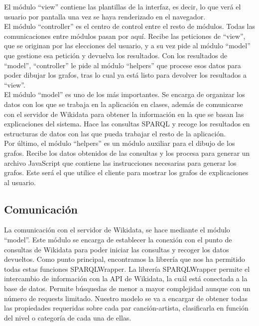 El módulo ``view'' contiene las plantillas de la interfaz, es decir, lo que verá el usuario por pantalla una vez se haya renderizado en el navegador.\\

El módulo ``controller'' es el centro de control entre el resto de módulos. Todas las comunicaciones entre módulos pasan por aquí. Recibe las peticiones de ``view'', que se originan por las elecciones del usuario, y a su vez pide al módulo ``model'' que gestione esa petición y devuelva los resultados. Con los resultados de ``model'', ``controller'' le pide al módulo ``helpers'' que procese esos datos para poder dibujar los grafos, tras lo cual ya está listo para devolver los resultados a ``view''.\\

El módulo ``model'' es uno de los más importantes. Se encarga de organizar los datos con los que se trabaja en la aplicación en clases, además de comunicarse con el servidor de Wikidata para obtener la información en la que se basan las explicaciones del sistema. Hace las consultas SPARQL y recoge los resultados en estructuras de datos con las que pueda trabajar el resto de la aplicación.\\

Por último, el módulo ``helpers'' es un módulo auxiliar para el dibujo de los grafos. Recibe los datos obtenidos de las consultas y los procesa para generar un archivo JavaScript que contiene las instrucciones necesarias para generar los grafos. Este será el que utilice el cliente para mostrar los grafos de explicaciones al usuario.\\

\subsection{Comunicación}

La comunicación con el servidor de Wikidata, se hace mediante el módulo ``model''. Este módulo se encarga de establecer la conexión con el punto de consultas de Wikidata para poder iniciar las consultas y recoger los datos devueltos. Como punto principal, encontramos la librería que nos ha permitido todas estas funciones SPARQLWrapper. La librería SPARQLWrapper permite el intercambio de información con la API de Wikidata, la cuál está conectada a la base de datos. Permite búsquedas de menor a mayor complejidad aunque con un número de requests limitado. Nuestro modelo se va a encargar de obtener todas las propiedades requeridas sobre cada par canción-artista, clasificarla en función del nivel o categoría de cada una de ellas.\\


